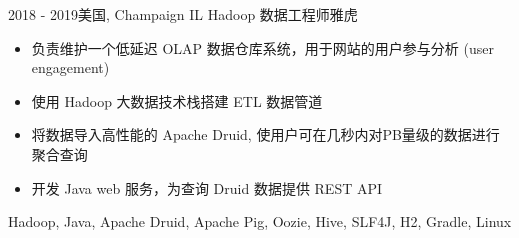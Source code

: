 \begin{experiences}
\experience
{2018 - 2019}{美国, Champaign IL}
{Hadoop 数据工程师}{雅虎}
{
    \begin{itemize}
    \item 负责维护一个低延迟 OLAP 数据仓库系统，用于网站的用户参与分析 (user engagement)
    \item 使用 Hadoop 大数据技术栈搭建 ETL 数据管道
    \item 将数据导入高性能的 Apache Druid, 使用户可在几秒内对PB量级的数据进行聚合查询
    \item 开发 Java web 服务，为查询 Druid 数据提供 REST API
    \end{itemize}
}
{Hadoop, Java, Apache Druid, Apache Pig, Oozie, Hive, SLF4J, H2, Gradle, Linux}

\end{experiences}